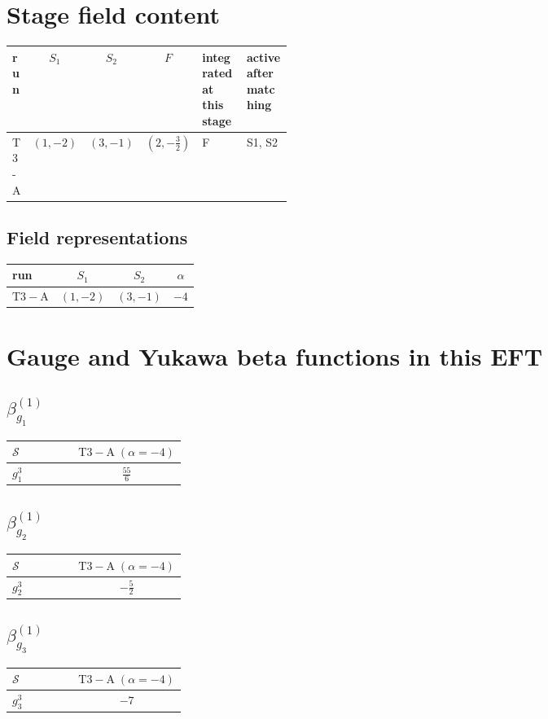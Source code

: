 \documentclass[9pt]{article}
\begin{document}
\section*{Stage field content}
\begin{longtable}{@{}lccc p{0.20\linewidth}p{0.20\linewidth}@{}}
\toprule
run & $S_1$ & $S_2$ & $F$ & integrated at this stage & active after matching \\
\midrule
T3-A & $(1,-2)$ & $(3,-1)$ & $(2,- \frac{3}{2})$ & F & S1, S2 \\
\bottomrule
\end{longtable}
\subsection*{Field representations}
\begin{longtable}{@{}lccc@{}}
\toprule
run & $S_1$ & $S_2$ & $\alpha$ \\
\midrule
$\mathrm{T3-A}$ & $(1,-2)$ & $(3,-1)$ & $-4$ \\
\bottomrule
\end{longtable}
\section*{Gauge and Yukawa beta functions in this EFT}
\subsection*{$ \beta_{g_1}^{(1)} $}
\begin{longtable}{@{}p{0.38\linewidth}c@{}}
\toprule
$\mathcal{S}$ & $ \mathrm{T3-A}\;(\alpha=-4) $ \\
\midrule
$ g_1^3 $ & $ \frac{55}{6} $ \\
\bottomrule
\end{longtable}
\subsection*{$ \beta_{g_2}^{(1)} $}
\begin{longtable}{@{}p{0.38\linewidth}c@{}}
\toprule
$\mathcal{S}$ & $ \mathrm{T3-A}\;(\alpha=-4) $ \\
\midrule
$ g_2^3 $ & $ - \frac{5}{2} $ \\
\bottomrule
\end{longtable}
\subsection*{$ \beta_{g_3}^{(1)} $}
\begin{longtable}{@{}p{0.38\linewidth}c@{}}
\toprule
$\mathcal{S}$ & $ \mathrm{T3-A}\;(\alpha=-4) $ \\
\midrule
$ g_3^3 $ & $ -7 $ \\
\bottomrule
\end{longtable}
\end{document}
